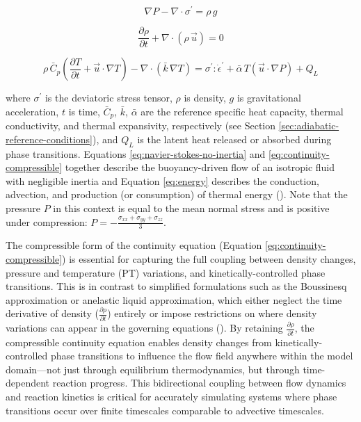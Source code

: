 \documentclass[
  paper=a4,
  ,captions=tableheading
]{scrartcl}
\begin{document}
\begin{equation}
  \nabla P - \nabla \cdot \sigma^{\prime} = \rho\, g
  \label{eq:navier-stokes-no-inertia}
\end{equation}

\begin{equation}
  \frac{\partial \rho}{\partial t} + \nabla \cdot (\rho\, \vec{u}) = 0
  \label{eq:continuity-compressible}
\end{equation}

\begin{equation}
  \rho\, \bar{C}_p \left(\frac{\partial T}{\partial t} + \vec{u} \cdot \nabla T \right) - \nabla \cdot \left(\bar{k}\, \nabla T \right) = \sigma^{\prime} : \dot{\epsilon}^{\prime} + \bar{\alpha}\, T \left(\vec{u} \cdot \nabla P \right) + Q_L
  \label{eq:energy}
\end{equation}

where \(\sigma^{\prime}\) is the deviatoric stress tensor, \(\rho\) is
density, \(g\) is gravitational acceleration, \(t\) is time,
\(\bar{C}_p\), \(\bar{k}\), \(\bar{\alpha}\) are the reference specific
heat capacity, thermal conductivity, and thermal expansivity,
respectively (see Section \ref{sec:adiabatic-reference-conditions}), and
\(Q_L\) is the latent heat released or absorbed during phase
transitions. Equations \ref{eq:navier-stokes-no-inertia} and
\ref{eq:continuity-compressible} together describe the buoyancy-driven
flow of an isotropic fluid with negligible inertia and Equation
\ref{eq:energy} describes the conduction, advection, and production (or
consumption) of thermal energy (). Note that the pressure \(P\) in this context is equal to
the mean normal stress and is positive under compression:
\(P = - \frac{\sigma_{xx} + \sigma_{yy} + \sigma_{zz}}{3}\).

The compressible form of the continuity equation (Equation
\ref{eq:continuity-compressible}) is essential for capturing the full
coupling between density changes, pressure and temperature (PT)
variations, and kinetically-controlled phase transitions. This is in
contrast to simplified formulations such as the Boussinesq approximation
or anelastic liquid approximation, which either neglect the time
derivative of density (\(\frac{\partial \rho}{\partial t}\)) entirely or
impose restrictions on where density variations can appear in the
governing equations (). By retaining \(\frac{\partial \rho}{\partial t}\), the
compressible continuity equation enables density changes from
kinetically-controlled phase transitions to influence the flow field
anywhere within the model domain---not just through equilibrium
thermodynamics, but through time-dependent reaction progress. This
bidirectional coupling between flow dynamics and reaction kinetics is
critical for accurately simulating systems where phase transitions occur
over finite timescales comparable to advective timescales.
\end{document}
